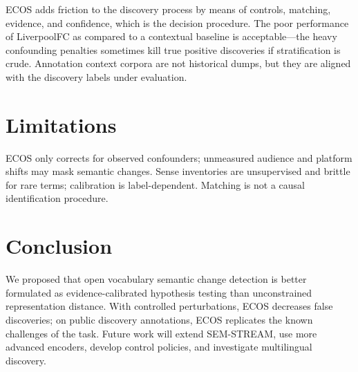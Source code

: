 \documentclass{llncs}
\begin{document}
ECOS adds friction to the discovery process by means of controls, matching, evidence, and confidence, which is the decision procedure. The poor performance of LiverpoolFC as compared to a contextual baseline is acceptable—the heavy confounding penalties sometimes kill true positive discoveries if stratification is crude. Annotation context corpora are not historical dumps, but they are aligned with the discovery labels under evaluation.

\section{Limitations}
\label{sec:limits}

ECOS only corrects for observed confounders; unmeasured audience and platform shifts may mask semantic changes. Sense inventories are unsupervised and brittle for rare terms; calibration is label-dependent. Matching is not a causal identification procedure.   

\section{Conclusion}
\label{sec:conclusion}

We proposed that open vocabulary semantic change detection is better formulated as evidence-calibrated hypothesis testing than unconstrained representation distance. With controlled perturbations, ECOS decreases false discoveries; on public discovery annotations, ECOS replicates the known challenges of the task. Future work will extend SEM-STREAM, use more advanced encoders, develop control policies, and investigate multilingual discovery.
\end{document}
